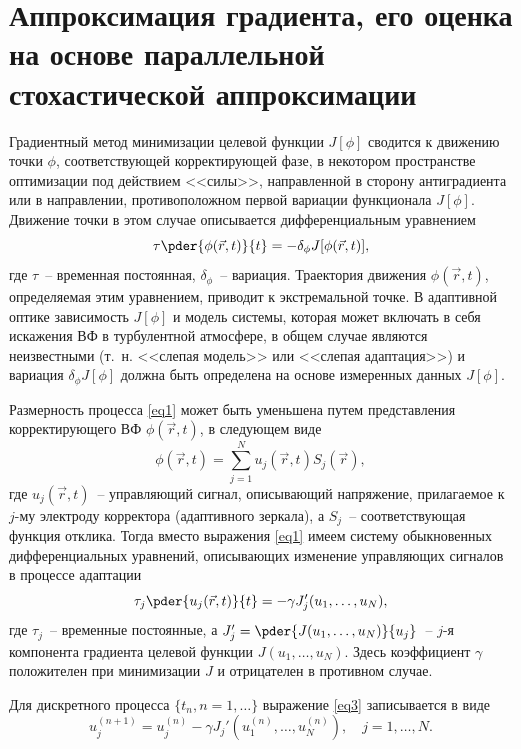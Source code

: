 \documentclass[pscyr]{hedwork}
\newcommand{\de}{\delta}
\newcommand{\eq}[1]{\eqref{eq#1}}
\begin{document}
\section{Аппроксимация градиента, его оценка на основе параллельной
стохастической аппроксимации}

Градиентный метод минимизации целевой функции \( J[\phi] \) сводится к движению
точки \( \phi \), соответствующей корректирующей фазе, в некотором пространстве
оптимизации под действием <<силы>>, направленной в сторону антиградиента или в
направлении, противоположном  первой  вариации  функционала \( J[\phi] \).
Движение точки в этом случае описывается дифференциальным уравнением
\begin{equation}
  \tau\pder{\phi(\vec{r}, t)}{t} = -\de_\phi J[\phi(\vec{r}, t)],
  \label{eq1}
\end{equation}
где \( \tau \)~-- временная постоянная, \( \de_\phi \)~-- вариация.
Траектория движения \( \phi(\vec{r}, t) \), определяемая этим уравнением,
приводит к экстремальной точке. В адаптивной оптике зависимость \( J[\phi] \) и
модель системы, которая может включать в себя искажения ВФ в турбулентной
атмосфере, в общем случае являются неизвестными (т.~н. <<слепая модель>> или
<<слепая адаптация>>) и вариация \( \de_\phi J[\phi] \) должна быть
определена на основе измеренных данных \( J[\phi] \).

Размерность процесса \eq{1} может быть уменьшена путем представления
корректирующего ВФ \( \phi(\vec{r}, t) \), в следующем виде
\[
  \phi(\vec{r}, t) = \sum_{j = 1}^N u_j(\vec{r}, t) S_j(\vec{r}),
\]
где \( u_j(\vec{r}, t) \)~-- управляющий сигнал, описывающий напряжение,
прилагаемое к \( j \)-му электроду корректора (адаптивного зеркала), а
\( S_j \)~-- соответствующая функция отклика. Тогда вместо выражения \eq{1}
имеем систему обыкновенных дифференциальных уравнений, описывающих изменение
управляющих сигналов в процессе адаптации
\begin{equation}
  \tau_j \pder{u_j(\vec{r}, t)}{t} = -\gamma J_j'(u_1, \ldots, u_N),
  \label{eq3}
\end{equation}
где \( \tau_j \)~-- временные постоянные, а
\( J_j' = \pder{J(u_1, \ldots, u_N)}{u_j} \)~-- \( j \)-я компонента градиента
целевой функции \( J(u_1, \ldots, u_N) \). Здесь коэффициент \( \gamma \)
положителен при минимизации \( J \) и отрицателен в противном случае.

Для дискретного процесса \( \{ t_n, n=1,\ldots \} \) выражение \eq{3}
записывается в виде
\begin{equation}
  u_j^{(n+1)} = u_j^{(n)} - \gamma J_j'(u_1^(n), \ldots, u_N^{(n)}), \quad
    j = 1, \ldots, N.
  \label{eq5}
\end{equation}
\end{document}

